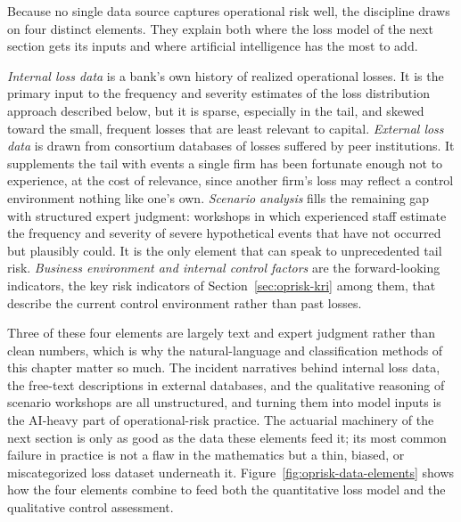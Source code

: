 \documentclass[../ai_in_finance]{subfiles}
\begin{document}
Because no single data source captures operational risk well, the discipline draws on four distinct elements. They explain both where the loss model of the next section gets its inputs and where artificial intelligence has the most to add.

\emph{Internal loss data} is a bank's own history of realized operational losses. It is the primary input to the frequency and severity estimates of the loss distribution approach described below, but it is sparse, especially in the tail, and skewed toward the small, frequent losses that are least relevant to capital. \emph{External loss data} is drawn from consortium databases of losses suffered by peer institutions. It supplements the tail with events a single firm has been fortunate enough not to experience, at the cost of relevance, since another firm's loss may reflect a control environment nothing like one's own. \emph{Scenario analysis} fills the remaining gap with structured expert judgment: workshops in which experienced staff estimate the frequency and severity of severe hypothetical events that have not occurred but plausibly could. It is the only element that can speak to unprecedented tail risk. \emph{Business environment and internal control factors} are the forward-looking indicators, the key risk indicators of Section~\ref{sec:oprisk-kri} among them, that describe the current control environment rather than past losses.

Three of these four elements are largely text and expert judgment rather than clean numbers, which is why the natural-language and classification methods of this chapter matter so much. The incident narratives behind internal loss data, the free-text descriptions in external databases, and the qualitative reasoning of scenario workshops are all unstructured, and turning them into model inputs is the AI-heavy part of operational-risk practice. The actuarial machinery of the next section is only as good as the data these elements feed it; its most common failure in practice is not a flaw in the mathematics but a thin, biased, or miscategorized loss dataset underneath it. Figure~\ref{fig:oprisk-data-elements} shows how the four elements combine to feed both the quantitative loss model and the qualitative control assessment.
\end{document}
